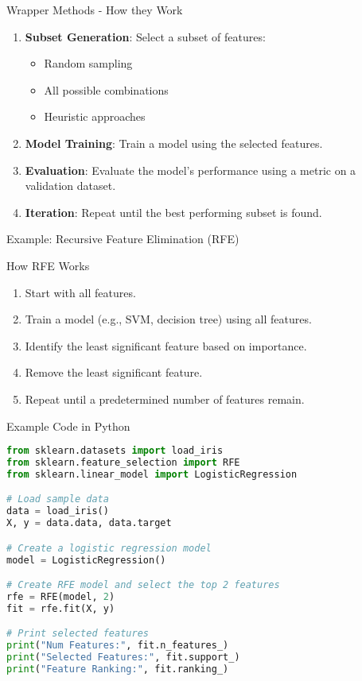 \documentclass[aspectratio=169]{beamer}
\begin{document}
\begin{frame}[fragile]{Wrapper Methods - How they Work}
    \begin{enumerate}
        \item \textbf{Subset Generation}: Select a subset of features:
            \begin{itemize}
                \item Random sampling
                \item All possible combinations
                \item Heuristic approaches
            \end{itemize}
        \item \textbf{Model Training}: Train a model using the selected features.
        \item \textbf{Evaluation}: Evaluate the model's performance using a metric on a validation dataset.
        \item \textbf{Iteration}: Repeat until the best performing subset is found.
    \end{enumerate}
\end{frame}

\begin{frame}[fragile]{Example: Recursive Feature Elimination (RFE)}
    \begin{block}{How RFE Works}
        \begin{enumerate}
            \item Start with all features.
            \item Train a model (e.g., SVM, decision tree) using all features.
            \item Identify the least significant feature based on importance.
            \item Remove the least significant feature.
            \item Repeat until a predetermined number of features remain.
        \end{enumerate}
    \end{block}
    
    \begin{block}{Example Code in Python}
        \begin{lstlisting}[language=Python]
from sklearn.datasets import load_iris
from sklearn.feature_selection import RFE
from sklearn.linear_model import LogisticRegression

# Load sample data
data = load_iris()
X, y = data.data, data.target

# Create a logistic regression model
model = LogisticRegression()

# Create RFE model and select the top 2 features
rfe = RFE(model, 2)
fit = rfe.fit(X, y)

# Print selected features
print("Num Features:", fit.n_features_)
print("Selected Features:", fit.support_)
print("Feature Ranking:", fit.ranking_)
        \end{lstlisting}
    \end{block}
\end{frame}
\end{document}
